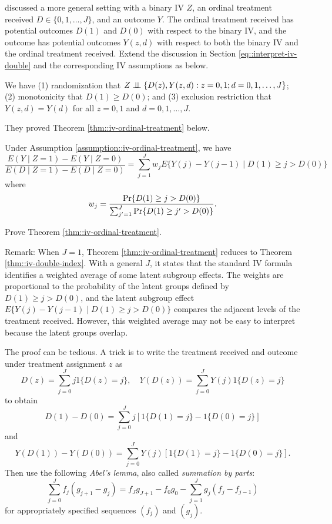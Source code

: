 \begin{HomeworkProblem}\label{exr:21-6}

\citet{angrist1995two} discussed a more general setting with a binary IV $Z$, an ordinal treatment received $D \in \{0,1,\ldots, J\}$, and an outcome $Y$. The ordinal treatment received has potential outcomes $D(1)$ and $D(0)$ with respect to the binary IV, and the outcome has potential outcomes $Y(z,d)$ with respect to both the binary IV and the ordinal treatment received. Extend the discussion in Section \ref{eq::interpret-iv-double} and the corresponding IV assumptions as below.

\begin{assumption}\label{assumption::iv-ordinal-treatment}
We have
(1) randomization that $Z\mathrel{\perp\!\!\!\perp} \{   D(z),  Y(z,d)  : z=0,1; d = 0,1,\ldots, J \}$;
(2) monotonicity that $D(1) \geq D(0)$; and
(3) exclusion restriction that $Y(z,d) = Y(d)$ for all $z=0,1$ and $ d = 0,1,\ldots, J $.
\end{assumption}

They proved Theorem \ref{thm::iv-ordinal-treatment} below.

\begin{Theorem}\label{thm::iv-ordinal-treatment}
Under Assumption \ref{assumption::iv-ordinal-treatment}, we have
\[
\frac{  E(Y\mid Z=1) - E(Y\mid Z=0) }{ E(D\mid Z=1) - E(D\mid Z=0)  }
= \sum_{j=1}^J  w_j E\{  Y(j) - Y(j-1)  \mid D(1) \geq j > D(0) \}
\]
where
\[
w_j = \frac{   \operatorname{Pr}\{  D(1) \geq j > D(0)   \}   }{   \sum_{j'=1}^J  \operatorname{Pr}\{  D(1) \geq j' > D(0)   \}   }.
\]
\end{Theorem}



Prove Theorem \ref{thm::iv-ordinal-treatment}.

Remark:
When $J=1$, Theorem \ref{thm::iv-ordinal-treatment} reduces to Theorem \ref{thm::iv-double-index}. With a general $J$, it states that the standard IV formula identifies a weighted average of some latent subgroup effects. The weights are proportional to the probability of the latent groups defined by $  D(1) \geq j > D(0) $, and the latent subgroup effect $E\{  Y(j) - Y(j-1)  \mid D(1) \geq j > D(0) \}$ compares the adjacent levels of the treatment received. However, this weighted average may not be easy to interpret because the latent groups overlap.



The proof can be tedious.
A trick is to write the treatment received and outcome under treatment assignment $z$ as
\[
D(z) = \sum_{j=0}^J j 1\{ D(z) = j\} ,\quad
Y(D(z)) = \sum_{j=0}^J  Y(j)1\{ D(z) = j\}
\]
to obtain
\[
D(1) - D(0) = \sum_{j=0}^J j [ 1\{ D(1) = j\} -1\{ D(0) = j\} ]
\]
and
\[
 Y(D(1))  - Y(D(0))   =
\sum_{j=0}^J Y(j)   [ 1\{ D(1) = j \}   - 1\{ D(0) = j \}  ].
\]
Then use the following {\it Abel's lemma}, also called {\it summation by parts}:
\[
\sum_{j=0}^J  f_j (g_{j+1} - g_j)
=
f_J g_{J+1} - f_0 g_0  - \sum_{j=1}^J g_j  (f_j - f_{j-1})
\]
for appropriately specified sequences $(f_j)$ and $(g_j)$.










\end{HomeworkProblem}
